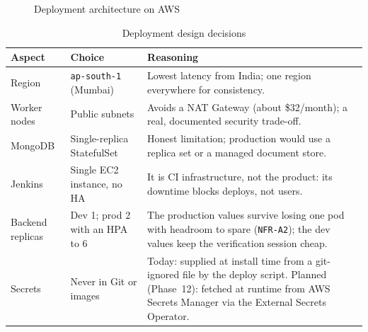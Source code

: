 \documentclass[11pt,a4paper]{article}
\newcommand{\reqid}[1]{\texttt{#1}}
\begin{document}
\begin{figure}[H]
{}
\caption{Deployment architecture on AWS}
\label{fig:deploy}
\end{figure}

\begin{table}[H]
\centering
\begin{tabularx}{\textwidth}{@{}L{2.8cm} L{3.9cm} Y@{}}
\toprule
\textbf{Aspect} & \textbf{Choice} & \textbf{Reasoning} \\
\midrule
Region & \texttt{ap-south-1} (Mumbai) & Lowest latency from India; one
    region everywhere for consistency. \\
Worker nodes & Public subnets & Avoids a NAT Gateway (about \$32/month); a
    real, documented security trade-off. \\
MongoDB & Single-replica StatefulSet & Honest limitation; production would
    use a replica set or a managed document store. \\
Jenkins & Single EC2 instance, no HA & It is CI infrastructure, not the
    product: its downtime blocks deploys, not users. \\
Backend replicas & Dev 1; prod 2 with an HPA to 6 & The production values
    survive losing one pod with headroom to spare (\reqid{NFR-A2}); the dev
    values keep the verification session cheap. \\
Secrets & Never in Git or images & Today: supplied at install time from a
    git-ignored file by the deploy script. Planned (Phase~12): fetched at
    runtime from AWS Secrets Manager via the External Secrets Operator. \\
\bottomrule
\end{tabularx}
\caption{Deployment design decisions}
\end{table}
\end{document}
